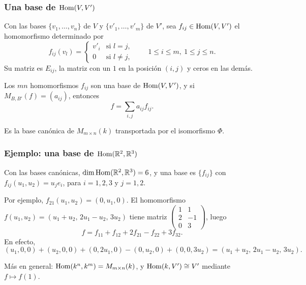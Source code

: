 \begin{frame}
    \frametitle{Una base de $\operatorname{Hom}(V,V')$}

    Con las bases $\{v_1,\ldots,v_n\}$ de $V$ y $\{v'_1,\ldots,v'_m\}$ de
    $V'$, sea $f_{ij}\in\operatorname{Hom}(V,V')$ el homomorfismo determinado por
    \[
        f_{ij}(v_l)=
        \begin{cases}
            v'_i&\text{si }l=j,\\
            0&\text{si }l\neq j,
        \end{cases}
        \qquad 1\leq i\leq m,\ 1\leq j\leq n.
    \]
    Su matriz es $E_{ij}$, la matriz con un $1$ en la posición $(i,j)$ y
    ceros en las demás.

    \begin{corollary}
        Los $mn$ homomorfismos $f_{ij}$ son una base de $\operatorname{Hom}(V,V')$, y si
        $M_{B,B'}(f)=(a_{ij})$, entonces
        \[
            f=\sum_{i,j}a_{ij}f_{ij}.
        \]
    \end{corollary}

    Es la base canónica de $M_{m\times n}(k)$ transportada por el
    isomorfismo $\Phi$.
\end{frame}


\begin{frame}
    \frametitle{Ejemplo: una base de $\operatorname{Hom}(\mathbb{R}^2,\mathbb{R}^3)$}

    \begin{example}
        Con las bases canónicas, $\dim\operatorname{Hom}(\mathbb{R}^2,\mathbb{R}^3)=6$, y una base es
        $\{f_{ij}\}$ con $f_{ij}(u_1,u_2)=u_je_i$, para $i=1,2,3$ y
        $j=1,2$.
    \end{example}

    Por ejemplo, $f_{21}(u_1,u_2)=(0,u_1,0)$. El homomorfismo
    $f(u_1,u_2)=(u_1+u_2,\,2u_1-u_2,\,3u_2)$ tiene matriz
    $\begin{pmatrix}1&1\\2&-1\\0&3\end{pmatrix}$, luego
    \[
        f=f_{11}+f_{12}+2f_{21}-f_{22}+3f_{32}.
    \]
    En efecto,
    \[
        (u_1,0,0)+(u_2,0,0)+(0,2u_1,0)-(0,u_2,0)+(0,0,3u_2)
        =(u_1+u_2,\,2u_1-u_2,\,3u_2).
    \]

    \medskip

    Más en general: $\operatorname{Hom}(k^n,k^m)=M_{m\times n}(k)$, y
    $\operatorname{Hom}(k,V')\cong V'$ mediante $f\mapsto f(1)$.
\end{frame}


